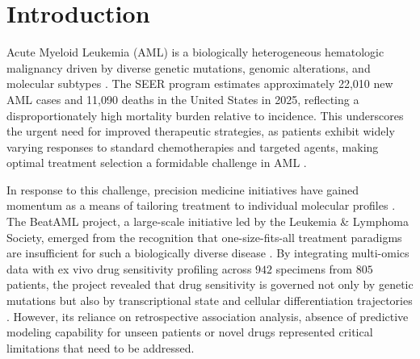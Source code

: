 \documentclass[sigconf,authordraft]{acmart}
\begin{document}



\maketitle

\section{Introduction}
Acute Myeloid Leukemia (AML) is a biologically heterogeneous hematologic malignancy driven by diverse genetic mutations, genomic alterations, and molecular subtypes \cite{cancer2013genomic,papaemmanuil2016genomic,kurzer2023updates}. The SEER program estimates approximately 22,010 new AML cases and 11,090 deaths in the United States in 2025, reflecting a disproportionately high mortality burden relative to incidence. This underscores the urgent need for improved therapeutic strategies, as patients exhibit widely varying responses to standard chemotherapies and targeted agents, making optimal treatment selection a formidable challenge in AML \cite{tyner2018functional, yu2020advances, shafiei2025omics}.

In response to this challenge, precision medicine initiatives have gained momentum as a means of tailoring treatment to individual molecular profiles \cite{lohse2018precision}. The BeatAML project, a large-scale initiative led by the Leukemia \& Lymphoma Society, emerged from the recognition that one-size-fits-all treatment paradigms are insufficient for such a biologically diverse disease \cite{bottomly2022integrative}. By integrating multi-omics data with ex vivo drug sensitivity profiling across $942$ specimens from $805$ patients, the project revealed that drug sensitivity is governed not only by genetic mutations but also by transcriptional state and cellular differentiation trajectories \cite{bottomly2022integrative,mo2023integrative}. However, its reliance on retrospective association analysis, absence of predictive modeling capability for unseen patients or novel drugs represented critical limitations that need to be addressed. 
\end{document}
